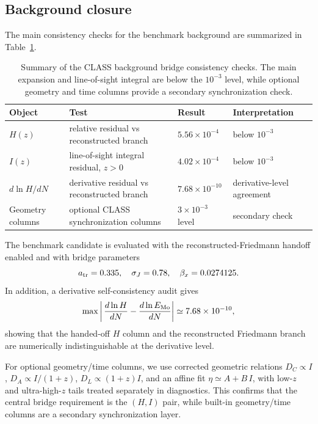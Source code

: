 ﻿\documentclass[11pt,prd,preprint,nofootinbib,amsmath,amssymb]{revtex4-2}
\begin{document}
\subsection{Background closure}

The main consistency checks for the benchmark background are summarized in
Table~\ref{tab:background_consistency}.

\begin{table}[t]
\centering
\small
\begin{tabular}{p{}p{}p{}p{}}
\toprule
Object & Test & Result & Interpretation \\
\midrule
$H(z)$ & relative residual vs reconstructed branch & $5.56\times10^{-4}$ & below $10^{-3}$ \\
$I(z)$ & line-of-sight integral residual, $z>0$ & $4.02\times10^{-4}$ & below $10^{-3}$ \\
$d\ln H/dN$ & derivative residual vs reconstructed branch & $7.68\times10^{-10}$ & derivative-level agreement \\
Geometry columns & optional CLASS synchronization columns & $3\times10^{-3}$ level & secondary check \\
\bottomrule
\end{tabular}
\caption{Summary of the CLASS background bridge consistency checks. The main
expansion and line-of-sight integral are below the $10^{-3}$ level, while
optional geometry and time columns provide a secondary synchronization check.}
\label{tab:background_consistency}
\end{table}

The benchmark candidate is evaluated with the reconstructed-Friedmann handoff enabled and
with bridge parameters
\begin{equation}
a_{\rm tr}=0.335,\quad \sigma_J=0.78,\quad \beta_x=0.0274125.
\end{equation}
In addition, a derivative self-consistency audit gives
\begin{equation}
\max\left|\,\frac{d\ln H}{dN}-\frac{d\ln E_{\rm Mo}}{dN}\right|
\simeq 7.68\times10^{-10},
\end{equation}
showing that the handed-off $H$ column and the reconstructed Friedmann branch are numerically indistinguishable at the derivative level.

For optional geometry/time columns, we use corrected geometric relations
$D_C\propto I$, $D_A\propto I/(1+z)$, $D_L\propto (1+z)I$, and an affine fit
$\eta\simeq A+B\,I$, with low-$z$ and ultra-high-$z$ tails treated separately in diagnostics.
This confirms that the central bridge requirement is the $(H,I)$ pair, while built-in
geometry/time columns are a secondary synchronization layer.
\end{document}
